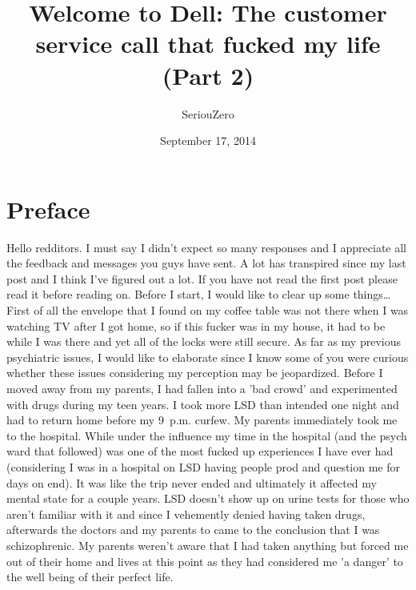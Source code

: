 \documentclass[a5paper]{scrartcl}
\title{Welcome to Dell: The customer service call that fucked my life (Part 2)}
\author{SeriouZero}
\date{September 17, 2014}
\begin{document}
\maketitle

\section*{Preface}
Hello redditors. I must say I didn't expect so many responses and I appreciate all the feedback and messages you guys have sent. A lot has transpired since my last post and I think I've figured out a lot.
If you have not read the first post please read it before reading on.
Before I start, I would like to clear up some things\dots\\


First of all the envelope that I found on my coffee table was not there when I was watching TV after I got home, so if this fucker was in my house, it had to be while I was there and yet all of the locks were still secure. As far as my previous psychiatric issues, I would like to elaborate since I know some of you were curious whether these issues considering my perception may be jeopardized. Before I moved away from my parents, I had fallen into a 'bad crowd' and experimented with drugs during my teen years. I took more LSD than intended one night and had to return home before my 9~p.m. curfew. My parents immediately took me to the hospital.
While under the influence my time in the hospital (and the psych ward that followed) was one of the most fucked up experiences I have ever had (considering I was in a hospital on LSD having people prod and question me for days on end). It was like the trip never ended and ultimately it affected my mental state for a couple years. LSD doesn't show up on urine tests for those who aren't familiar with it and since I vehemently denied having taken drugs, afterwards the doctors and my parents to came to the conclusion that I was schizophrenic. My parents weren't aware that I had taken anything but forced me out of their home and lives at this point as they had considered me 'a danger' to the well being of their perfect life.\\
\end{document}
